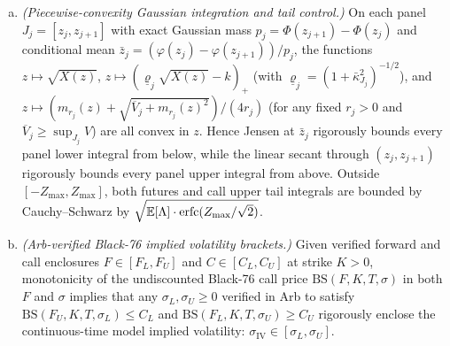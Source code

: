 \begin{proposition}
\begin{enumerate}[(a)]
\begin{align*}
    &\quad\times\sqrt{1+a_r^2 D_{0,i}^{\max}\exp\!\big(a_r^2\sqrt{D_{0,i}^{\max}}\,\bar d_i\big)}\;\bar d_i.
  \end{align*}
  Moreover, on any $z$-panel $J=[z_a,z_b]$ with reference point $\bar z\in J$ and radius
  $h_J=\max(\bar z-z_a,z_b-\bar z)$, setting $\bar g=\tfrac12(g_{\min}+g_{\max})$,
  $\Delta_g=\tfrac12(g_{\max}-g_{\min})$, and $S(\bar z)=\sum_{r,i} W_{r,i}(\bar z)\sqrt{\expmone(a_r^2 D_{0,i}^{\max})}$,
  \begin{align}
    \sup_{z\in J}\sqrt{V(z)}&\;\le\;e^{\bar g h_J}\big(\sqrt{V(\bar z)}\nonumber\\
    &\qquad+\expmone(\Delta_g h_J)\,S(\bar z)\big),\label{eq:minkowski_zV}\\
    \sup_{z\in J}\frac{\sqrt{V(z)}}{X(z)}&\;\le\;e^{\Delta_g h_J}\,\frac{\sqrt{V(\bar z)}+\expmone(\Delta_g h_J)\,S(\bar z)}{X(\bar z)}\nonumber\\
    &=:\bar\kappa_J.\label{eq:minkowski_zkappa}
  \end{align}
\item \emph{(Piecewise-convexity Gaussian integration and tail control.)} On each panel $J_j=[z_j,z_{j+1}]$
  with exact Gaussian mass $p_j=\Phi(z_{j+1})-\Phi(z_j)$ and conditional mean
  $\bar z_j=(\varphi(z_j)-\varphi(z_{j+1}))/p_j$, the functions $z\mapsto\sqrt{X(z)}$,
  $z\mapsto(\underline{\varrho}_j\sqrt{X(z)}-k)_+$ (with $\underline{\varrho}_j=(1+\bar\kappa_{J_j}^2)^{-1/2}$),
  and $z\mapsto(m_{r_j}(z)+\sqrt{\overline{V}_j+m_{r_j}(z)^2})/(4r_j)$ (for any fixed $r_j>0$ and
  $\overline{V}_j\ge\sup_{J_j}V$) are all convex in $z$. Hence Jensen at $\bar z_j$ rigorously bounds every
  panel lower integral from below, while the linear secant through $(z_j,z_{j+1})$ rigorously bounds every
  panel upper integral from above. Outside $[-Z_{\max},Z_{\max}]$, both futures and call upper tail
  integrals are bounded by Cauchy--Schwarz by $\sqrt{\mathbb{E}[\Lambda]\cdot\operatorname{erfc}(Z_{\max}/\sqrt{2})}$.
\item \emph{(Arb-verified Black-76 implied volatility brackets.)} Given verified forward and call enclosures
  $F\in[F_L,F_U]$ and $C\in[C_L,C_U]$ at strike $K>0$, monotonicity of the undiscounted Black-76 call price
  $\mathrm{BS}(F,K,T,\sigma)$ in both $F$ and $\sigma$ implies that any $\sigma_L,\sigma_U\ge0$ verified in
  Arb to satisfy $\mathrm{BS}(F_U,K,T,\sigma_L)\le C_L$ and $\mathrm{BS}(F_L,K,T,\sigma_U)\ge C_U$ rigorously
  enclose the continuous-time model implied volatility: $\sigma_{\mathrm{IV}}\in[\sigma_L,\sigma_U]$.
\end{enumerate}
\end{proposition}

